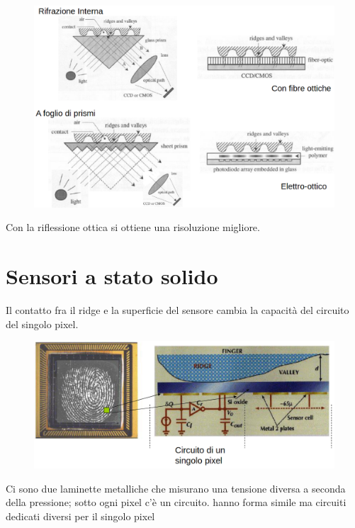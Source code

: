 \documentclass{report}
\begin{document}
\begin{figure}[ht]
    \centering
    \includegraphics[width=1\linewidth]{images/ottici.png}
\end{figure}

\noindent Con la riflessione ottica si ottiene una risoluzione migliore.

\newpage
\section{Sensori a stato solido}

Il contatto fra il ridge e la superficie del sensore cambia la capacità
del circuito del singolo pixel.

\begin{figure}[ht]
    \centering
    \includegraphics[width=1\linewidth]{images/statosolido.png}
\end{figure}

\noindent Ci sono due laminette metalliche che misurano una tensione diversa a seconda
della pressione; sotto ogni pixel c'è un circuito.
hanno forma simile ma circuiti dedicati diversi per il singolo pixel
\end{document}
